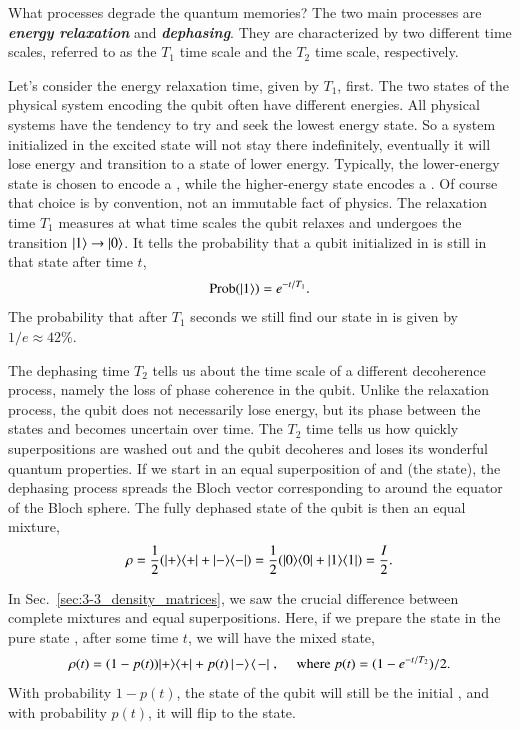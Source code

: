 What processes degrade the quantum memories?
The two main processes are \textbf{\emph{energy relaxation}} and \textbf{\emph{dephasing}}.
They are characterized by two different time scales, referred to as the $T_1$ time scale and the $T_2$ time scale, respectively.

Let's consider the energy relaxation time, given by $T_1$, first.
The two states of the physical system encoding the qubit often have different energies.
All physical systems have the tendency to try and seek the lowest energy state.
So a system initialized in the excited state will not stay there indefinitely, eventually it will lose energy and transition to a state of lower energy.
Typically, the lower-energy state is chosen to encode a , while the higher-energy state encodes a .
Of course that choice is by convention, not an immutable fact of physics.
The relaxation time $T_1$ measures at what time scales the qubit relaxes and undergoes the transition $\left| 1 \right\rangle\rightarrow\left| 0 \right\rangle$.
It tells the probability that a qubit initialized in  is still in that state after time $t$,
\begin{equation}
    \operatorname{Prob}(\left| 1 \right\rangle)=e^{-t / T_1}.
\end{equation}
The probability that after $T_1$ seconds we still find our state in  is given by $1/e\approx 42 \%$.

The dephasing time $T_2$ tells us about the time scale of a different decoherence process, namely the loss of phase coherence in the qubit.
Unlike the relaxation process, the qubit does not necessarily lose energy, but its phase between the states  and  becomes uncertain over time.
The $T_2$ time tells us how quickly superpositions are washed out and the qubit decoheres and loses its wonderful quantum properties.
If we start in an equal superposition of  and  (the \ket{+} state), the dephasing process spreads the Bloch vector corresponding to \ket{+} around the equator of the Bloch sphere.
The fully dephased state of the qubit is then an equal mixture,
\begin{equation}
    \rho = \frac{1}{2} ( |+ \rangle \langle +|+|- \rangle \langle -| ) = \frac{1}{2} ( |0 \rangle \langle 0|+|1 \rangle \langle 1| ) = \frac{I}{2}.
\end{equation}

In Sec.~\ref{sec:3-3_density_matrices}, we saw the crucial difference between complete mixtures and equal superpositions. Here, if we prepare the state in the pure state \ket{+}, after some time $t$, we will have the mixed state,
\begin{equation}
    \rho(t) = (1-p(t)) |+\rangle\langle+| + p(t) \outp{-}{-}, \quad \text{ where }  p(t)=(1-e^{-t / T_2})/2.
\end{equation}
With probability $1-p(t)$, the state of the qubit will still be the initial \ket{+}, and with probability $p(t)$, it will flip to the \ket{-} state.

